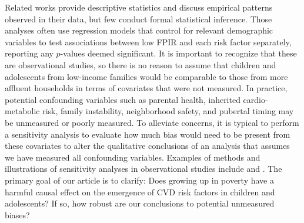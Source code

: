\documentclass[12pt,leqno,titlepage]{amsart}
\newcommand{\1}{\mathbbm{1}}
\begin{document}
\begin{bibunit}
Related works provide descriptive statistics and discuss empirical patterns observed in their data, but few conduct formal statistical inference. Those analyses often use regression models that control for relevant demographic variables to test associations between low FPIR and each risk factor separately, reporting any $p$-values deemed significant. It is important to recognize that these are observational studies, so there is no reason to assume that children and adolescents from low-income families would be comparable to those from more affluent households in terms of covariates that were not measured. In practice, potential confounding variables such as parental health, inherited cardio-metabolic risk, family instability, neighborhood safety, and pubertal timing may be unmeasured or poorly measured. To alleviate concerns, it is typical to perform a sensitivity analysis to evaluate how much bias would need to be present from these covariates to alter the qualitative conclusions of an analysis that assumes we have measured all confounding variables. Examples of methods and illustrations of sensitivity analyses in observational studies include 
\cite{cornfield1959smoking} and
\cite{tan2006distributional}. 
The primary goal of our article is to clarify: Does growing up in poverty have a harmful causal effect on the emergence of CVD risk factors in children and adolescents? If so, how robust are our conclusions to potential unmeasured biases?



\end{bibunit}
\end{document}
